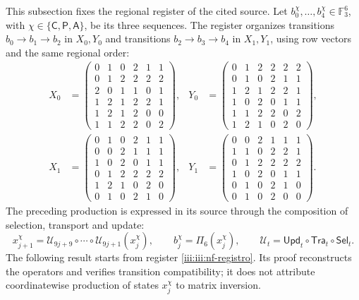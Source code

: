This subsection fixes the regional register of the cited source.
Let $b_0^\chi,\ldots,b_4^\chi\in\mathbb F_3^6$, with
$\chi\in\{\mathsf C,\mathsf P,\mathsf A\}$, be its three sequences.
The register organizes transitions $b_0\to b_1\to b_2$ in
$X_0,Y_0$ and transitions $b_2\to b_3\to b_4$ in $X_1,Y_1$,
using row vectors and the same regional order:
\begingroup\small
\begin{equation}
\begin{aligned}
X_0&=\begin{pmatrix}
0&1&0&2&1&1\\0&1&2&2&2&2\\2&0&1&1&0&1\\
1&2&1&2&2&1\\1&2&1&2&0&0\\1&1&2&2&0&2
\end{pmatrix},&
Y_0&=\begin{pmatrix}
0&1&2&2&2&2\\0&1&0&2&1&1\\1&2&1&2&2&1\\
1&0&2&0&1&1\\1&1&2&2&0&2\\1&2&1&0&2&0
\end{pmatrix},\\[1ex]
X_1&=\begin{pmatrix}
0&1&0&2&1&1\\0&0&2&1&1&1\\1&0&2&0&1&1\\
0&1&2&2&2&2\\1&2&1&0&2&0\\0&1&0&2&1&0
\end{pmatrix},&
Y_1&=\begin{pmatrix}
0&0&2&1&1&1\\1&1&0&2&2&1\\0&1&2&2&2&2\\
1&0&2&0&1&1\\0&1&0&2&1&0\\0&1&0&2&0&0
\end{pmatrix}.
\end{aligned}
\label{iii:iii:nf-registro}
\end{equation}
\endgroup
The preceding production is expressed in its source through
the composition of selection, transport and update:
\[
 x_{j+1}^{\chi}
 =\mathcal U_{9j+9}\circ\cdots\circ\mathcal U_{9j+1}(x_j^{\chi}),
 \qquad b_j^\chi=\Pi_6(x_j^\chi),
 \qquad\mathcal U_t=\mathsf{Upd}_t\circ\mathsf{Tra}_t\circ\mathsf{Sel}_t.
\]
The following result starts from register \eqref{iii:iii:nf-registro}.
Its proof reconstructs the operators and verifies
transition compatibility; it does not attribute coordinatewise
production of states $x_j^\chi$ to matrix inversion.

